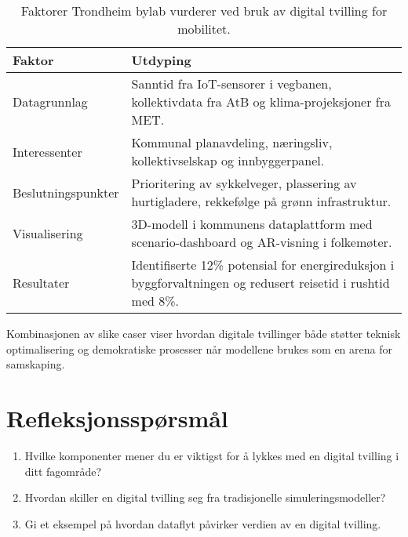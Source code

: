 \begin{table}[ht]
    \centering
    \caption{Faktorer Trondheim bylab vurderer ved bruk av digital tvilling for mobilitet.}
    \label{tab:kap01-trondheim}
    \begin{tabular}{p{}p{}}
        \toprule
        \textbf{Faktor} & \textbf{Utdyping} \\
        \midrule
        Datagrunnlag & Sanntid fra IoT-sensorer i vegbanen, kollektivdata fra AtB og klima-projeksjoner fra MET. \\
        Interessenter & Kommunal planavdeling, næringsliv, kollektivselskap og innbyggerpanel. \\
        Beslutningspunkter & Prioritering av sykkelveger, plassering av hurtigladere, rekkefølge på grønn infrastruktur. \\
        Visualisering & 3D-modell i kommunens dataplattform med scenario-dashboard og AR-visning i folkemøter. \\
        Resultater & Identifiserte 12\% potensial for energireduksjon i byggforvaltningen og redusert reisetid i rushtid med 8\%. \\
        \bottomrule
    \end{tabular}
\end{table}

Kombinasjonen av slike caser viser hvordan digitale tvillinger både støtter teknisk optimalisering og demokratiske prosesser når modellene brukes som en arena for samskaping.

\section{Refleksjonsspørsmål}
\begin{enumerate}
    \item Hvilke komponenter mener du er viktigst for å lykkes med en digital tvilling i ditt fagområde?
    \item Hvordan skiller en digital tvilling seg fra tradisjonelle simuleringsmodeller?
    \item Gi et eksempel på hvordan dataflyt påvirker verdien av en digital tvilling.
\end{enumerate}

